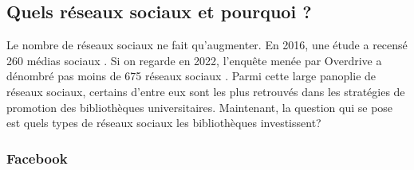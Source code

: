 \documentclass[a4paper,11pt]{article} %
\begin{document}
\subsection{ Quels réseaux sociaux et pourquoi ?}

Le nombre de réseaux sociaux ne fait qu'augmenter. En 2016, une étude a recensé 260 médias sociaux \citep{mesguich2017bibliothèques,}. Si on regarde en 2022, l’enquête menée par Overdrive a dénombré pas moins de 675 réseaux sociaux \citep{jin2022social,}. Parmi cette large panoplie de réseaux sociaux, certains d’entre eux sont les plus retrouvés dans les stratégies de promotion des bibliothèques universitaires. Maintenant, la question qui se pose est quels types de réseaux sociaux les bibliothèques investissent?

\subsubsection{Facebook}
\end{document}
